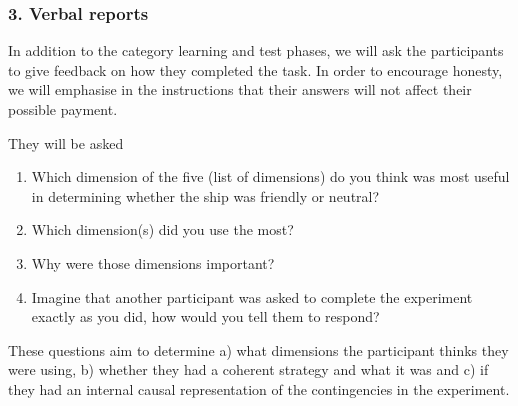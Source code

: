 \documentclass[doc, a4paper, apacite]{apa6}
\begin{document}
\subsubsection{3. Verbal reports}
In addition to the category learning and test phases, we will ask the participants to give feedback on how they completed the task. 
In order to encourage honesty, we will emphasise in the instructions that their answers will not affect their possible payment. 

They will be asked
\begin{enumerate}
	\item Which dimension of the five (list of dimensions) do you think was most useful in determining whether the ship was friendly or neutral?
	\item Which dimension(s) did you use the most?
	\item Why were those dimensions important?
	\item Imagine that another participant was asked to complete the experiment exactly as you did, how would you tell them to respond?
\end{enumerate}

These questions aim to determine a) what dimensions the participant thinks they were using, b) whether they had a coherent strategy and what it was and c) if they had an internal causal representation of the contingencies in the experiment. 


\clearpage
\newpage


\end{document}
